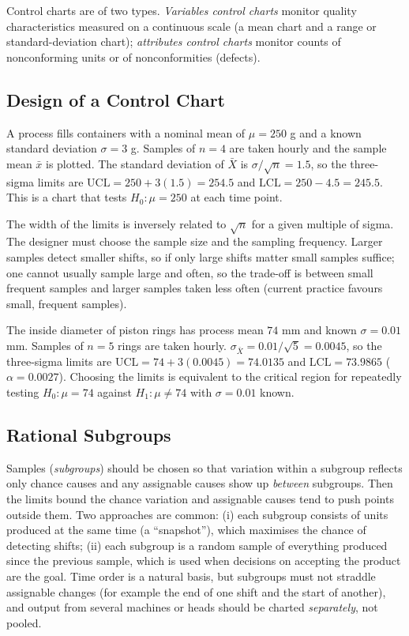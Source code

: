 Control charts are of two types. \emph{Variables control charts} monitor quality characteristics measured on a continuous scale (a mean chart and a range or standard-deviation chart); \emph{attributes control charts} monitor counts of nonconforming units or of nonconformities (defects).

\subsection{Design of a Control Chart}

\begin{example}\label{ex:xbardesign}
A process fills containers with a nominal mean of $\mu=250$ g and a known standard deviation $\sigma=3$ g. Samples of $n=4$ are taken hourly and the sample mean $\bar{x}$ is plotted. The standard deviation of $\bar{X}$ is $\sigma/\sqrt n=1.5$, so the three-sigma limits are $\mathrm{UCL}=250+3(1.5)=254.5$ and $\mathrm{LCL}=250-4.5=245.5$. This is a chart that tests $H_0:\mu=250$ at each time point.
\end{example}

The width of the limits is inversely related to $\sqrt n$ for a given multiple of sigma. The designer must choose the sample size and the sampling frequency. Larger samples detect smaller shifts, so if only large shifts matter small samples suffice; one cannot usually sample large and often, so the trade-off is between small frequent samples and larger samples taken less often (current practice favours small, frequent samples).

\begin{example}
The inside diameter of piston rings has process mean $74$ mm and known $\sigma=0.01$ mm. Samples of $n=5$ rings are taken hourly. $\sigma_{\bar{X}}=0.01/\sqrt5=0.0045$, so the three-sigma limits are $\mathrm{UCL}=74+3(0.0045)=74.0135$ and $\mathrm{LCL}=73.9865$ ($\alpha=0.0027$). Choosing the limits is equivalent to the critical region for repeatedly testing $H_0:\mu=74$ against $H_1:\mu\ne74$ with $\sigma=0.01$ known.
\end{example}

\subsection{Rational Subgroups}

Samples (\emph{subgroups}) should be chosen so that variation within a subgroup reflects only chance causes and any assignable causes show up \emph{between} subgroups. Then the limits bound the chance variation and assignable causes tend to push points outside them. Two approaches are common: (i) each subgroup consists of units produced at the same time (a ``snapshot''), which maximises the chance of detecting shifts; (ii) each subgroup is a random sample of everything produced since the previous sample, which is used when decisions on accepting the product are the goal. Time order is a natural basis, but subgroups must not straddle assignable changes (for example the end of one shift and the start of another), and output from several machines or heads should be charted \emph{separately}, not pooled.

